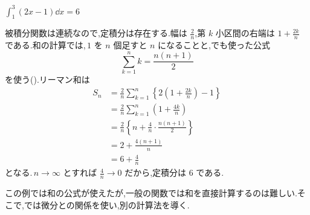 $\int_1^3(2x-1)\dd x=6$

被積分関数は連続なので,定積分は存在する.幅は $\frac2n$,第 $k$ 小区間の右端は $1+\frac{2k}{n}$ である.和の計算では,\,$1$ を $n$ 個足すと $n$ になることと,でも使った公式
\[
 \sum_{k=1}^{n}k=\frac{n(n+1)}2
\]
を使う().リーマン和は
\begin{align*}
 S_n
 &=\frac2n\sum_{k=1}^{n}\left\{2\left(1+\frac{2k}n\right)-1\right\}\\
 &=\frac2n\sum_{k=1}^{n}\left(1+\frac{4k}n\right)\\
 &=\frac2n\left\{n+\frac4n\cdot\frac{n(n+1)}2\right\}\\
 &=2+\frac{4(n+1)}{n}\\
 &=6+\frac4n
\end{align*}
となる.\,$n\to\infty$ とすれば $\frac4n\to0$ だから,定積分は $6$ である.

この例では和の公式が使えたが,一般の関数では和を直接計算するのは難しい.そこで,では微分との関係を使い,別の計算法を導く.
